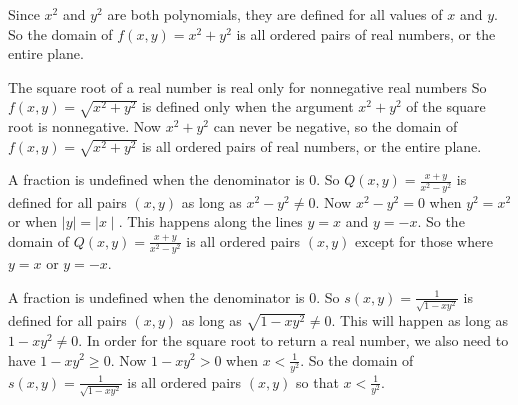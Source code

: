 \begin{activitySolution}
\ba
\item Since $x^2$ and $y^2$ are both polynomials, they are defined for all values of $x$ and $y$. So the domain of $f(x,y) = x^2+y^2$ is all ordered pairs of real numbers, or the entire plane. 
\item The square root of a real number is real only for nonnegative real numbers So $f(x,y) = \sqrt{x^2+y^2}$ is defined only when the argument $x^2+y^2$ of the square root is nonnegative. Now $x^2+y^2$ can never be negative, so the domain of $f(x,y) = \sqrt{x^2+y^2}$ is all ordered pairs of real numbers, or the entire plane. 
\item A fraction is undefined when the denominator is 0. So $Q(x,y) = \frac{x+y}{x^2-y^2}$ is defined for all pairs $(x,y)$ as long as $x^2-y^2 \neq 0$. Now $x^2-y^2=0$ when $y^2=x^2$ or when $\mid y \mid = \mid x \mid$. This happens along the lines $y=x$ and $y=-x$. So the domain of $Q(x,y) = \frac{x+y}{x^2-y^2}$ is all ordered pairs $(x,y)$ except for those where $y=x$ or $y=-x$.  
\item A fraction is undefined when the denominator is 0. So $s(x,y) = \frac{1}{\sqrt{1-xy^2}}$ is defined for all pairs $(x,y)$ as long as $\sqrt{1-xy^2} \neq 0$. This will happen as long as $1-xy^2 \neq 0$. In order for the square root to return a real number, we also need to have $1-xy^2 \geq 0$. Now $1-xy^2 > 0$ when $x < \frac{1}{y^2}$. So the domain of $s(x,y) = \frac{1}{\sqrt{1-xy^2}}$ is all ordered pairs $(x,y)$ so that $x < \frac{1}{y^2}$. 
\ea
\end{activitySolution}

\aftera 